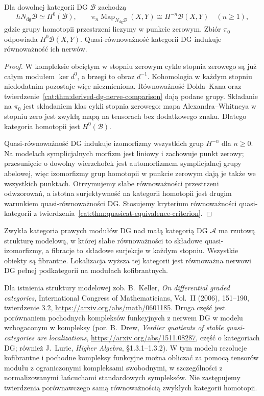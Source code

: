 \begin{stwierdzenie}\label{cat:prop:derived-dg-nerve-homotopy}
Dla dowolnej kategorii DG $\mathcal B$ zachodzą
\[
 hN_{\mathrm{dg}}\mathcal B\simeq H^0(\mathcal B),
 \qquad
 \pi_n\operatorname{Map}_{N_{\mathrm{dg}}\mathcal B}(X,Y)
 \cong H^{-n}\mathcal B(X,Y)\quad(n\geq1),
\]
gdzie grupy homotopii przestrzeni liczymy w punkcie zerowym. Zbiór $\pi_0$ odpowiada $H^0\mathcal B(X,Y)$. Quasi-równoważność kategorii DG indukuje równoważność ich nerwów.
\end{stwierdzenie}
\begin{proof}
W kompleksie obciętym w stopniu zerowym cykle stopnia zerowego są już całym modułem $\ker d^0$, a brzegi to obraz $d^{-1}$. Kohomologia w każdym stopniu niedodatnim pozostaje więc niezmieniona. Równoważność Dolda--Kana oraz twierdzenie~\ref{cat:thm:derived-dg-nerve-comparison} dają podane grupy. Składanie na $\pi_0$ jest składaniem klas cykli stopnia zerowego: mapa Alexandra--Whitneya w stopniu zero jest zwykłą mapą na tensorach bez dodatkowego znaku. Dlatego kategoria homotopii jest $H^0(\mathcal B)$.

Quasi-równoważność DG indukuje izomorfizmy wszystkich grup $H^{-n}$ dla $n\geq0$. Na modelach symplicjalnych morfizm jest liniowy i zachowuje punkt zerowy; przesunięcie o dowolny wierzchołek jest automorfizmem symplicjalnej grupy abelowej, więc izomorfizmy grup homotopii w punkcie zerowym dają je także we wszystkich punktach. Otrzymujemy słabe równoważności przestrzeni odwzorowań, a istotna surjektywność na kategorii homotopii jest drugim warunkiem quasi-równoważności DG. Stosujemy kryterium równoważności quasi-kategorii z twierdzenia~\ref{cat:thm:quasicat-equivalence-criterion}.
\end{proof}

\begin{twierdzenie}\label{cat:thm:derived-dg-model-structure}
Zwykła kategoria prawych modułów DG nad małą kategorią DG $\mathcal A$ ma rzutową strukturę modelową, w której słabe równoważności to składowe quasi-izomorfizmy, a fibracje to składowe surjekcje w każdym stopniu. Wszystkie obiekty są fibrantne. Lokalizacja wyższa tej kategorii jest równoważna nerwowi DG pełnej podkategorii na modułach kofibrantnych.
\end{twierdzenie}

Dla istnienia struktury modelowej zob. B.~Keller, \emph{On differential graded categories}, International Congress of Mathematicians, Vol.~II (2006), 151--190, twierdzenie 3.2, \url{https://arxiv.org/abs/math/0601185}. Druga część jest porównaniem pochodnych kompleksów funkcyjnych z nerwem DG w modelu wzbogaconym w kompleksy (por. B.~Drew, \emph{Verdier quotients of stable quasi-categories are localizations}, \url{https://arxiv.org/abs/1511.08287}, część o kategoriach DG; również J.~Lurie, \emph{Higher Algebra}, \S1.3.1--1.3.2). W tym modelu rezolucje kofibrantne i pochodne kompleksy funkcyjne można obliczać za pomocą tensorów modułu z ograniczonymi kompleksami swobodnymi, w szczególności z normalizowanymi łańcuchami standardowych sympleksów. Nie zastępujemy twierdzenia porównawczego samą równoważnością zwykłych kategorii homotopii.

